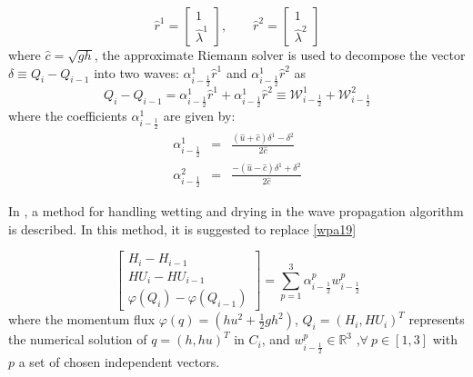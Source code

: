 \documentclass[10pt,a4paper]{article}
\begin{document}
{	\begin{equation}
		\hat{r}^1 =  \begin{bmatrix} 1 \\ 	\hat{\lambda}^1 \end{bmatrix}, \qquad 	\hat{r}^2 =  
		\begin{bmatrix} 1 \\ 	\hat{\lambda}^2 \end{bmatrix}
		\label{vec}
	\end{equation}
	where $\hat{c} = \sqrt{gh}$, the approximate Riemann solver is used to decompose the vector  $ \delta \equiv Q_{i} - Q_{i-1}$ into two waves: $\alpha_{i-\frac{1}{2}}^{1} \hat{r}^1$ and $\alpha_{i-\frac{1}{2}}^{1} \hat{r}^2$ as 
	\begin{equation}
		Q_{i} - Q_{i-1} = \alpha_{i-\frac{1}{2}}^{1} \hat{r}^1 + \alpha_{i-\frac{1}{2}}^{1} \hat{r}^2 \equiv \mathcal{W}_{i-\frac{1}{2}}^{1} + \mathcal{W}_{i-\frac{1}{2}}^{2}
	\end{equation}
	where the coefficients $\alpha_{i-\frac{1}{2}}^{1}$ are given by:
	\begin{eqnarray}
		\alpha_{i-\frac{1}{2}}^{1} &=& \frac{(\hat{u} + \hat{c})\delta^{1} - \delta^2}{2\hat{c}}\\
		\alpha_{i-\frac{1}{2}}^{2} &=& \frac{-(\hat{u} - \hat{c})\delta^{1} + \delta^2}{2\hat{c}}
	\end{eqnarray}
	}

	In \cite{ge:2008,ge:2011}, a method for handling wetting and drying in the wave propagation algorithm is described.  In this method, it is suggested to replace 
	\eqref{wpa19}


	\begin{equation}
		\begin{bmatrix} 
			H_{i} - H_{i-1}\\ 	HU_{i} - HU_{i-1} \\  \varphi(Q_{i}) - \varphi(Q_{i-1}) 
		\end{bmatrix} = \sum_{p=1}^{3} \alpha_{i-\frac{1}{2}}^{p} w_{i-\frac{1}{2}}^{p}
		\label{p5}
	\end{equation}
	where the momentum flux $\varphi(q) = (hu^{2} + \frac{1}{2} gh^{2})$, $Q_{i} = (H_{i},HU_{i})^{T}$ represents the numerical solution of $q = (h,hu)^{T}$ in $C_{i}$, and $w_{i-\frac{1}{2}}^{p} \in \mathbb{R}^{3}$ ,$\forall ~ p \in [1,3] $ with $p$ a set of chosen independent vectors. \\
	
\end{document}
